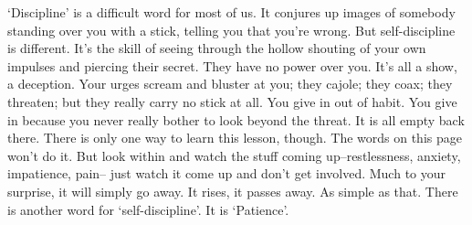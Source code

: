 `Discipline' is a difficult word for most of us. It conjures up images of
somebody standing over you with a stick, telling you that you're wrong. But
self-discipline is different. It's the skill of seeing through the hollow
shouting of your own impulses and piercing their secret. They have no power over
you. It's all a show, a deception. Your urges scream and bluster at you; they
cajole; they coax; they threaten; but they really carry no stick at all. You
give in out of habit. You give in because you never really bother to look beyond
the threat. It is all empty back there. There is only one way to learn this
lesson, though. The words on this page won't do it. But look within and watch
the stuff coming up--restlessness, anxiety, impatience, pain-- just watch it
come up and don't get involved. Much to your surprise, it will simply go away.
It rises, it passes away. As simple as that. There is another word for
`self-discipline'. It is `Patience'.